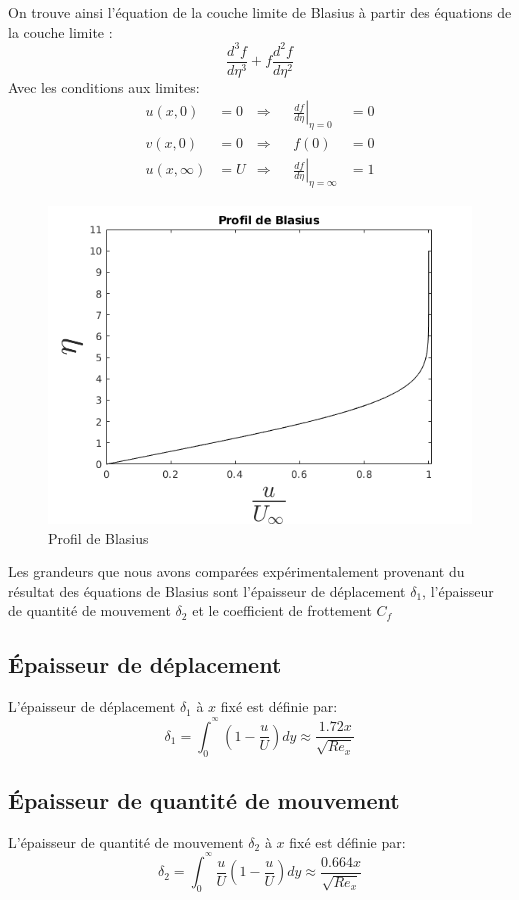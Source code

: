 On trouve ainsi l'équation de la couche limite de Blasius à partir des équations de la couche limite :
\begin{equation}	
	\frac{d^{3}f}{d\eta^{3}} + f\frac{d^{2} f}{d\eta^{2}}
\end{equation}
Avec les conditions aux limites:
\begin{align}
	u(x,0) &= 0 &\Rightarrow &&
	\left.
	\frac{d f}{d \eta}     \right|_{\eta = 0} &= 0
	\\
	v(x,0) &= 0 &\Rightarrow &&
	f(0) &= 0
	\\
	u(x,\infty) &= U &\Rightarrow &&
	\left.
	\frac{d f}{d \eta} \right|_{\eta = \infty} &= 1
\end{align}
\newpage
\begin{figure}[ht]
	\centering
	\includegraphics[scale = 0.6]{./image/Blasius.png}
	\caption{Profil de Blasius}
\end{figure}
Les grandeurs que nous avons comparées expérimentalement provenant du résultat des équations de Blasius sont l'épaisseur de déplacement $\delta_{1}$, l'épaisseur de quantité de mouvement $\delta_{2}$ et le coefficient de frottement $C_{f}$
\subsection{Épaisseur de déplacement}
L'épaisseur de déplacement $\delta_{1}$ à $x$ fixé est définie par:
\begin{equation}
	\delta_{1} = 
	\int_{0}^{^\infty}
	\left(
	1 - 
	\frac{u}{U}
	\right)
	dy
	\approx \frac{1.72x}{\sqrt{Re_{x}}}
\end{equation}
\subsection{Épaisseur de quantité de mouvement}
L'épaisseur de quantité de mouvement $\delta_{2}$ à $x$ fixé est définie par:
\begin{equation}
	\delta_{2} = 
	\int_{0}^{^\infty}
	\frac{u}{U}
	\left(
	1 - 
	\frac{u}{U}
	\right)
	dy
	\approx \frac{0.664x}{\sqrt{Re_{x}}}
\end{equation}
